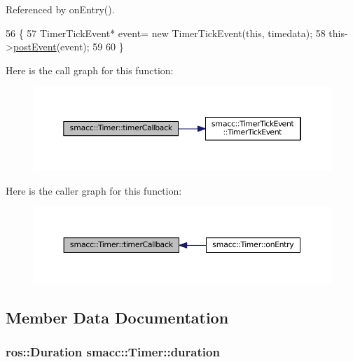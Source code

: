 Referenced by on\+Entry().


\begin{DoxyCode}
56   \{
57     TimerTickEvent* \textcolor{keyword}{event}= \textcolor{keyword}{new} TimerTickEvent(\textcolor{keyword}{this}, timedata);
58     this->\hyperlink{classsmacc_1_1SmaccSubStateBehavior_a8538664f9828247727a27446112788a2}{postEvent}(event);
59 
60   \}   
\end{DoxyCode}


Here is the call graph for this function\+:
\nopagebreak
\begin{figure}[H]
\begin{center}
\leavevmode
\includegraphics[width=350pt]{classsmacc_1_1Timer_a3939cbeb19e5a7d9c02c56064805b242_cgraph}
\end{center}
\end{figure}




Here is the caller graph for this function\+:
\nopagebreak
\begin{figure}[H]
\begin{center}
\leavevmode
\includegraphics[width=350pt]{classsmacc_1_1Timer_a3939cbeb19e5a7d9c02c56064805b242_icgraph}
\end{center}
\end{figure}




\subsection{Member Data Documentation}
\subsubsection[{\texorpdfstring{duration}{duration}}]{\setlength{\rightskip}{0pt plus 5cm}ros\+::\+Duration smacc\+::\+Timer\+::duration}\hypertarget{classsmacc_1_1Timer_a564c0bbd2b12909d61a1345358c641fc}{}\label{classsmacc_1_1Timer_a564c0bbd2b12909d61a1345358c641fc}



